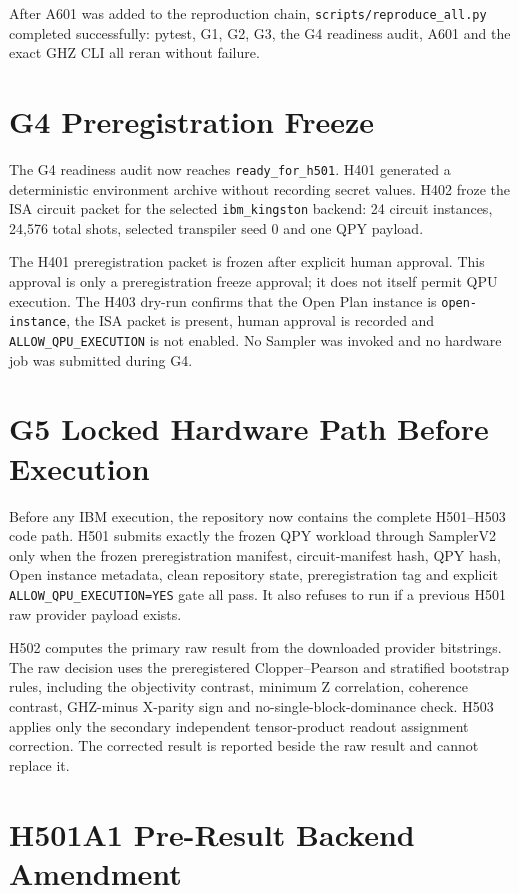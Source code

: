 \documentclass[11pt]{article}
\begin{document}
After A601 was added to the reproduction chain, \texttt{scripts/reproduce\_all.py}
completed successfully: pytest, G1, G2, G3, the G4 readiness audit, A601 and
the exact GHZ CLI all reran without failure.

\section{G4 Preregistration Freeze}

The G4 readiness audit now reaches \texttt{ready\_for\_h501}. H401 generated a
deterministic environment archive without recording secret values. H402 froze the
ISA circuit packet for the selected \texttt{ibm\_kingston} backend: 24 circuit
instances, 24,576 total shots, selected transpiler seed 0 and one QPY payload.

The H401 preregistration packet is frozen after explicit human approval. This
approval is only a preregistration freeze approval; it does not itself permit QPU
execution. The H403 dry-run confirms that the Open Plan instance is
\texttt{open-instance}, the ISA packet is present, human approval is recorded and
\texttt{ALLOW\_QPU\_EXECUTION} is not enabled. No Sampler was invoked and no
hardware job was submitted during G4.

\section{G5 Locked Hardware Path Before Execution}

Before any IBM execution, the repository now contains the complete H501--H503
code path. H501 submits exactly the frozen QPY workload through SamplerV2 only
when the frozen preregistration manifest, circuit-manifest hash, QPY hash, Open
instance metadata, clean repository state, preregistration tag and explicit
\texttt{ALLOW\_QPU\_EXECUTION=YES} gate all pass. It also refuses to run if a
previous H501 raw provider payload exists.

H502 computes the primary raw result from the downloaded provider bitstrings.
The raw decision uses the preregistered Clopper--Pearson and stratified
bootstrap rules, including the objectivity contrast, minimum Z correlation,
coherence contrast, GHZ-minus X-parity sign and no-single-block-dominance check.
H503 applies only the secondary independent tensor-product readout assignment
correction. The corrected result is reported beside the raw result and cannot
replace it.

\section{H501A1 Pre-Result Backend Amendment}
\end{document}
